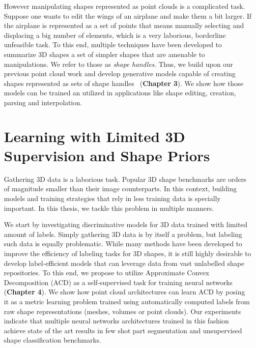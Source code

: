 However manipulating shapes represented as point clouds is a complicated task.
Suppose one wants to edit the wings of an airplane and make them a bit larger.
If the airplane is represented as a set of points that means manually selecting and displacing
a big number of elements, which is a very laborious, borderline unfeasible task.
To this end, multiple techniques have been developed to summarize 3D shapes a set of
simpler shapes that are amenable to manipulations.
We refer to those as \emph{shape handles}.
Thus, we build upon our previous point cloud work and develop generative models capable
of creating shapes represented as sets of shape handles~\cite{shapehandles} (\textbf{Chapter 3}).
We show how those models can be trained an utilized in applications like
shape editing, creation, parsing and interpolation.


\section*{Learning with Limited 3D Supervision and Shape Priors}

Gathering 3D data is a laborious task.
Popular 3D shape benchmarks are orders of magnitude smaller than their image counterparts.
In this context, building models and training strategies that rely in less training data is specially
important.
In this thesis, we tackle this problem in multiple manners.

We start by investigating discriminative models for 3D data trained with limited amount of labels.
Simply gathering 3D data is by itself a problem, but labeling such data is equally problematic.
While many methods have been developed to improve the efficiency of labeling tasks for 3D shapes,
it is still highly desirable to develop label-efficient models that can leverage data from vast
unlabelled shape repositories.
To this end, we propose to utilize Approximate Convex Decomposition (ACD) as a self-supervised task for
training neural networks (\textbf{Chapter 4}).
We show how point cloud architectures can learn ACD by posing it as a metric learning problem trained using automatically computed labels from raw shape representations (meshes, volumes or point clouds). 
Our experiments indicate that multiple neural networks architectures trained in this fashion achieve
state of the art results in few shot part segmentation and unsupervised shape classification benchmarks.

